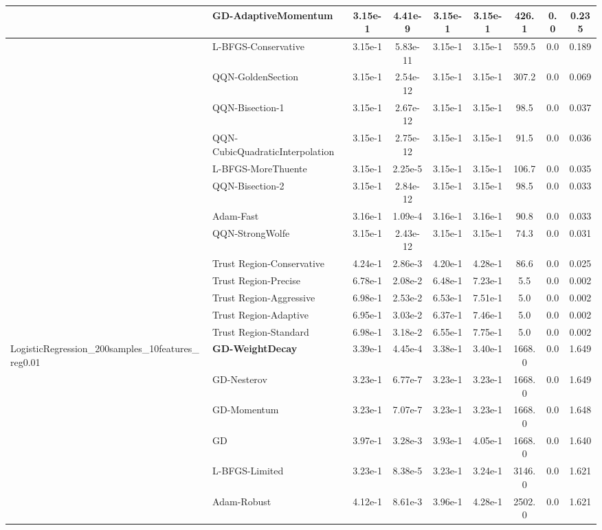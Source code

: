 \documentclass{article}
\begin{document}
\begin{longtable}{|l|l|c|c|c|c|c|c|c|}
\hline
 & GD-AdaptiveMomentum & 3.15e-1 & 4.41e-9 & 3.15e-1 & 3.15e-1 & 426.1 & 0.0 & 0.235 \\
\hline
 & L-BFGS-Conservative & 3.15e-1 & 5.83e-11 & 3.15e-1 & 3.15e-1 & 559.5 & 0.0 & 0.189 \\
\hline
 & QQN-GoldenSection & 3.15e-1 & 2.54e-12 & 3.15e-1 & 3.15e-1 & 307.2 & 0.0 & 0.069 \\
\hline
 & QQN-Bisection-1 & 3.15e-1 & 2.67e-12 & 3.15e-1 & 3.15e-1 & 98.5 & 0.0 & 0.037 \\
\hline
 & QQN-CubicQuadraticInterpolation & 3.15e-1 & 2.75e-12 & 3.15e-1 & 3.15e-1 & 91.5 & 0.0 & 0.036 \\
\hline
 & L-BFGS-MoreThuente & 3.15e-1 & 2.25e-5 & 3.15e-1 & 3.15e-1 & 106.7 & 0.0 & 0.035 \\
\hline
 & QQN-Bisection-2 & 3.15e-1 & 2.84e-12 & 3.15e-1 & 3.15e-1 & 98.5 & 0.0 & 0.033 \\
\hline
 & Adam-Fast & 3.16e-1 & 1.09e-4 & 3.16e-1 & 3.16e-1 & 90.8 & 0.0 & 0.033 \\
\hline
 & QQN-StrongWolfe & 3.15e-1 & 2.43e-12 & 3.15e-1 & 3.15e-1 & 74.3 & 0.0 & 0.031 \\
\hline
 & Trust Region-Conservative & 4.24e-1 & 2.86e-3 & 4.20e-1 & 4.28e-1 & 86.6 & 0.0 & 0.025 \\
\hline
 & Trust Region-Precise & 6.78e-1 & 2.08e-2 & 6.48e-1 & 7.23e-1 & 5.5 & 0.0 & 0.002 \\
\hline
 & Trust Region-Aggressive & 6.98e-1 & 2.53e-2 & 6.53e-1 & 7.51e-1 & 5.0 & 0.0 & 0.002 \\
\hline
 & Trust Region-Adaptive & 6.95e-1 & 3.03e-2 & 6.37e-1 & 7.46e-1 & 5.0 & 0.0 & 0.002 \\
\hline
 & Trust Region-Standard & 6.98e-1 & 3.18e-2 & 6.55e-1 & 7.75e-1 & 5.0 & 0.0 & 0.002 \\
LogisticRegression\_200samples\_10features\_reg0.01 & \textbf{GD-WeightDecay} & 3.39e-1 & 4.45e-4 & 3.38e-1 & 3.40e-1 & 1668.0 & 0.0 & 1.649 \\
\hline
 & GD-Nesterov & 3.23e-1 & 6.77e-7 & 3.23e-1 & 3.23e-1 & 1668.0 & 0.0 & 1.649 \\
\hline
 & GD-Momentum & 3.23e-1 & 7.07e-7 & 3.23e-1 & 3.23e-1 & 1668.0 & 0.0 & 1.648 \\
\hline
 & GD & 3.97e-1 & 3.28e-3 & 3.93e-1 & 4.05e-1 & 1668.0 & 0.0 & 1.640 \\
\hline
 & L-BFGS-Limited & 3.23e-1 & 8.38e-5 & 3.23e-1 & 3.24e-1 & 3146.0 & 0.0 & 1.621 \\
\hline
 & Adam-Robust & 4.12e-1 & 8.61e-3 & 3.96e-1 & 4.28e-1 & 2502.0 & 0.0 & 1.621 \\

\end{longtable}
\end{document}
